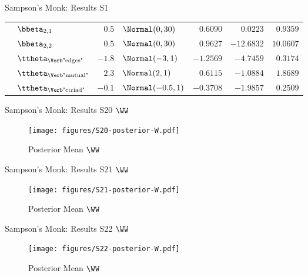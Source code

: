 \documentclass{beamer}
\begin{document}
\begin{frame}{Sampson's Monk: Results S1}
\begin{center}
\begin{tabular}{cl|rlrrr}
			& $\bbeta_{2,1}$                   & $0.5$  & $\Normal(0,30)$      & $0.6090$  & $0.0223$   & $0.9359$  \\
			& $\bbeta_{2,2}$                   & $0.5$  & $\Normal(0,30)$      & $0.9627$  & $-12.6832$ & $10.0607$ \\
			& $\ttheta_{\text{\Verb"edges"}}$  & $-1.8$ & $\Normal(-3,1)$      & $-1.2569$ & $-4.7459$  & $0.3174$  \\
			& $\ttheta_{\text{\Verb"mutual"}}$ & $2.3$  & $\Normal(2,1)$       & $0.6115$  & $-1.0884$  & $1.8689$  \\
			& $\ttheta_{\text{\Verb"ctriad"}}$ & $-0.1$ & $\Normal(-0.5,1)$    & $-0.3708$ & $-1.9857$  & $0.2509$  \\
			\bottomrule
		\end{tabular}
	\end{center}
\end{frame}

\begin{frame}{Sampson's Monk: Results S20 $\WW$}
	\begin{figure}[H]
		\centering
		\texttt{[image: figures/S20-posterior-W.pdf]}
		\caption{Posterior Mean $\WW$}
	\end{figure}
\end{frame}

\begin{frame}{Sampson's Monk: Results S21 $\WW$}
	\begin{figure}[H]
		\centering
		\texttt{[image: figures/S21-posterior-W.pdf]}
		\caption{Posterior Mean $\WW$}
	\end{figure}
\end{frame}

\begin{frame}{Sampson's Monk: Results S22 $\WW$}
	\begin{figure}[H]
		\centering
		\texttt{[image: figures/S22-posterior-W.pdf]}
		\caption{Posterior Mean $\WW$}
	\end{figure}
\end{frame}
\end{document}
